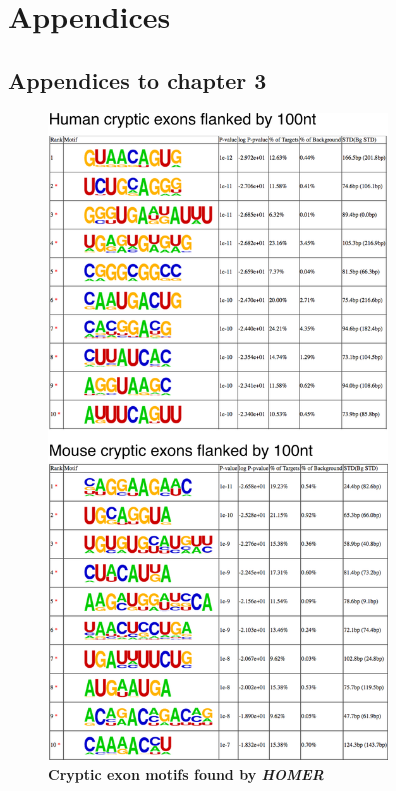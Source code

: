 
\chapter[Appendices]{\LARGE{Appendices}}
\clearpage	


\section{Appendices to chapter 3}

\begin{figure}
	\begin{center}
		\includegraphics[width=9cm]{Figures/03_cryptic_exons/Figure_S4_HOMER.png}
	\end{center}
	\caption[Cryptic exon motifs found by \textit{HOMER}]{
		\textbf{Cryptic exon motifs found by \textit{HOMER}}
	}
\end{figure}

\clearpage

	\addtolength{\abovecaptionskip}{-25mm}



